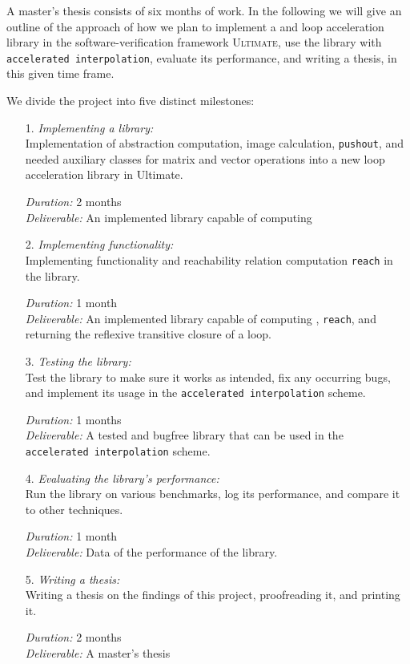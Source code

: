 A master's thesis consists of six months of work. In the following we will give an outline of the approach of how we plan to implement a \qvasr and \qvasrs loop acceleration library in the software-verification framework \textsc{Ultimate}, use the library with \texttt{accelerated interpolation}, evaluate its performance, and writing a thesis, in this given time frame. \\ \par
We divide the project into five distinct milestones:

\begin{itemize}
	\item[1.] \textsl{Implementing a \qvasr library:} \\
               Implementation of \qvasr abstraction computation, \qvasr image calculation, \texttt{pushout}, and needed auxiliary classes for matrix and vector operations into a new loop acceleration library in Ultimate.

			  \textsl{Duration:} 2 months \\
			  \textsl{Deliverable:} An implemented library capable of computing \qvasr

	\item[2.] \textsl{Implementing \qvasrs functionality:} \\
               Implementing \qvasrs functionality and reachability relation computation \texttt{reach} in the \qvasr library.

			  \textsl{Duration:} 1 month \\
			  \textsl{Deliverable:} An implemented library capable of computing \qvasrs, \texttt{reach}, and returning the reflexive transitive closure of a loop.

	\item[3.] \textsl{Testing the library:} \\
               Test the library to make sure it works as intended, fix any occurring bugs, and implement its usage in the \texttt{accelerated interpolation} scheme.

			  \textsl{Duration:} 1 months \\
			  \textsl{Deliverable:} A tested and bugfree \qvasr library that can be used in the \texttt{accelerated interpolation} scheme.

	\item[4.] \textsl{Evaluating the library's performance:} \\
               Run the library on various benchmarks, log its performance, and compare it to other techniques.

			  \textsl{Duration:} 1 month \\
			  \textsl{Deliverable:} Data of the performance of the \qvasr library.

	\item[5.] \textsl{Writing a thesis:} \\
              Writing a thesis on the findings of this project, proofreading it, and printing it.

			  \textsl{Duration:} 2 months \\
			  \textsl{Deliverable:}	A master's thesis
\end{itemize}
